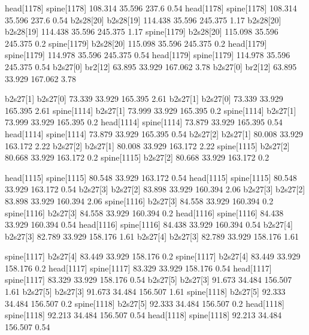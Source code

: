 head[1178]    spine[1178]    108.314    35.596    237.6    0.54
head[1178]    spine[1178]    108.314    35.596    237.6    0.54
b2s28[20]    b2s28[19]    114.438    35.596    245.375    1.17
b2s28[20]    b2s28[19]    114.438    35.596    245.375    1.17
spine[1179]    b2s28[20]    115.098    35.596    245.375    0.2
spine[1179]    b2s28[20]    115.098    35.596    245.375    0.2
head[1179]    spine[1179]    114.978    35.596    245.375    0.54
head[1179]    spine[1179]    114.978    35.596    245.375    0.54
b2s27[0]    br2[12]    63.895    33.929    167.062    3.78
b2s27[0]    br2[12]    63.895    33.929    167.062    3.78


b2s27[1]    b2s27[0]    73.339    33.929    165.395    2.61
b2s27[1]    b2s27[0]    73.339    33.929    165.395    2.61
spine[1114]    b2s27[1]    73.999    33.929    165.395    0.2
spine[1114]    b2s27[1]    73.999    33.929    165.395    0.2
head[1114]    spine[1114]    73.879    33.929    165.395    0.54
head[1114]    spine[1114]    73.879    33.929    165.395    0.54
b2s27[2]    b2s27[1]    80.008    33.929    163.172    2.22
b2s27[2]    b2s27[1]    80.008    33.929    163.172    2.22
spine[1115]    b2s27[2]    80.668    33.929    163.172    0.2
spine[1115]    b2s27[2]    80.668    33.929    163.172    0.2


head[1115]    spine[1115]    80.548    33.929    163.172    0.54
head[1115]    spine[1115]    80.548    33.929    163.172    0.54
b2s27[3]    b2s27[2]    83.898    33.929    160.394    2.06
b2s27[3]    b2s27[2]    83.898    33.929    160.394    2.06
spine[1116]    b2s27[3]    84.558    33.929    160.394    0.2
spine[1116]    b2s27[3]    84.558    33.929    160.394    0.2
head[1116]    spine[1116]    84.438    33.929    160.394    0.54
head[1116]    spine[1116]    84.438    33.929    160.394    0.54
b2s27[4]    b2s27[3]    82.789    33.929    158.176    1.61
b2s27[4]    b2s27[3]    82.789    33.929    158.176    1.61


spine[1117]    b2s27[4]    83.449    33.929    158.176    0.2
spine[1117]    b2s27[4]    83.449    33.929    158.176    0.2
head[1117]    spine[1117]    83.329    33.929    158.176    0.54
head[1117]    spine[1117]    83.329    33.929    158.176    0.54
b2s27[5]    b2s27[3]    91.673    34.484    156.507    1.61
b2s27[5]    b2s27[3]    91.673    34.484    156.507    1.61
spine[1118]    b2s27[5]    92.333    34.484    156.507    0.2
spine[1118]    b2s27[5]    92.333    34.484    156.507    0.2
head[1118]    spine[1118]    92.213    34.484    156.507    0.54
head[1118]    spine[1118]    92.213    34.484    156.507    0.54


